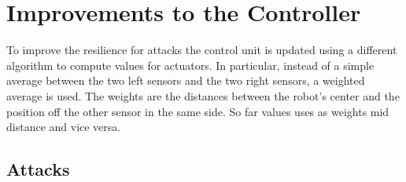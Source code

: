 \chapter{Improvements to the Controller}

To improve the resilience for attacks the control unit is updated using a
different algorithm to compute values for actuators. In particular, instead of
a simple average between the two left sensors and the two right sensors, a
weighted average is used. The weights are the distances between the robot's
center and the position off the other sensor in the same side. So far values
uses as weights mid distance and vice versa.

\section{Attacks}





